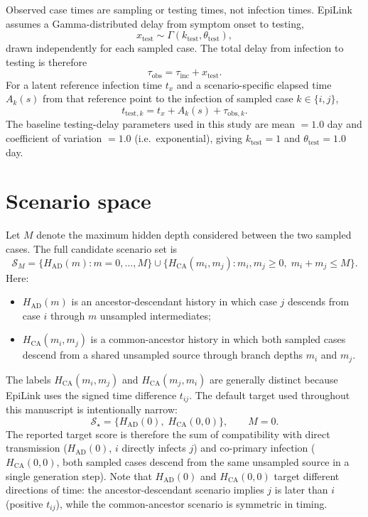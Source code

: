 \documentclass[11pt,a4paper]{article}
\begin{document}
Observed case times are sampling or testing times, not infection times. EpiLink assumes a Gamma-distributed delay from symptom onset to testing,
\[
	x_{\mathrm{test}} \sim \Gamma(k_{\mathrm{test}}, \theta_{\mathrm{test}}),
\]
drawn independently for each sampled case. The total delay from infection to testing is therefore
\[
	\tau_{\mathrm{obs}} = \tau_{\mathrm{inc}} + x_{\mathrm{test}}.
\]
For a latent reference infection time $t_x$ and a scenario-specific elapsed time $A_k(s)$ from that reference point to the infection of sampled case $k \in \{i, j\}$,
\[
	t_{\mathrm{test},k} = t_x + A_k(s) + \tau_{\mathrm{obs},k}.
\]
The baseline testing-delay parameters used in this study are mean $= 1.0$ day and coefficient of variation $= 1.0$ (i.e.\ exponential), giving $k_{\mathrm{test}} = 1$ and $\theta_{\mathrm{test}} = 1.0$ day.

\section{Scenario space}\label{sec:S1_scenarios}

Let $M$ denote the maximum hidden depth considered between the two sampled cases. The full candidate scenario set is
\[
	\mathcal{S}_M =
	\bigl\{H_{\mathrm{AD}}(m): m = 0,\ldots,M\bigr\}
	\cup
	\bigl\{H_{\mathrm{CA}}(m_i,m_j): m_i,m_j \ge 0,\; m_i+m_j \le M\bigr\}.
\]
Here:
\begin{itemize}
	\item $H_{\mathrm{AD}}(m)$ is an ancestor-descendant history in which case $j$ descends from case $i$ through $m$ unsampled intermediates;
	\item $H_{\mathrm{CA}}(m_i,m_j)$ is a common-ancestor history in which both sampled cases descend from a shared unsampled source through branch depths $m_i$ and $m_j$.
\end{itemize}

The labels $H_{\mathrm{CA}}(m_i,m_j)$ and $H_{\mathrm{CA}}(m_j,m_i)$ are generally distinct because EpiLink uses the signed time difference $t_{ij}$. The default target used throughout this manuscript is intentionally narrow:
\[
	\mathcal{S}_\star = \bigl\{H_{\mathrm{AD}}(0),\; H_{\mathrm{CA}}(0,0)\bigr\}, \qquad M = 0.
\]
The reported target score is therefore the sum of compatibility with direct transmission ($H_{\mathrm{AD}}(0)$, $i$ directly infects $j$) and co-primary infection ($H_{\mathrm{CA}}(0,0)$, both sampled cases descend from the same unsampled source in a single generation step). Note that $H_{\mathrm{AD}}(0)$ and $H_{\mathrm{CA}}(0,0)$ target different directions of time: the ancestor-descendant scenario implies $j$ is later than $i$ (positive $t_{ij}$), while the common-ancestor scenario is symmetric in timing.
\end{document}
